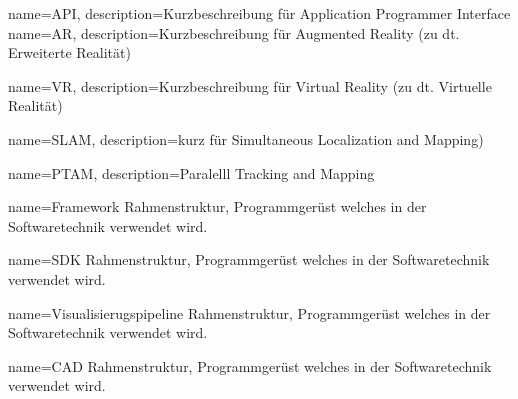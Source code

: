 
{
	name={API},
	description={Kurzbeschreibung für Application Programmer Interface}
}
{
	name={AR},
	description={Kurzbeschreibung für Augmented Reality (zu dt. Erweiterte Realität)}
}

{
	name={VR},
	description={Kurzbeschreibung für Virtual Reality (zu dt. Virtuelle Realität)}
}

{
	name={SLAM},
	description={kurz für Simultaneous Localization and Mapping)}
}

{
	name={PTAM},
	description={Paralelll Tracking and Mapping}
}



{
	name=Framework
}
{Rahmenstruktur, Programmgerüst welches in der Softwaretechnik verwendet wird.}

{
	name=SDK
}
{Rahmenstruktur, Programmgerüst welches in der Softwaretechnik verwendet wird.}

{
	name=Visualisierugspipeline
}
{Rahmenstruktur, Programmgerüst welches in der Softwaretechnik verwendet wird.}

{
	name=CAD
}
{Rahmenstruktur, Programmgerüst welches in der Softwaretechnik verwendet wird.}